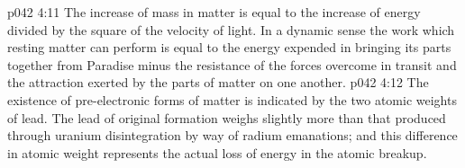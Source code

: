 \vs p042 4:11 The increase of mass in matter is equal to the increase of energy divided by the square of the velocity of light. In a dynamic sense the work which resting matter can perform is equal to the energy expended in bringing its parts together from Paradise minus the resistance of the forces overcome in transit and the attraction exerted by the parts of matter on one another.
\vs p042 4:12 \pc The existence of pre\hyp{}electronic forms of matter is indicated by the two atomic weights of lead. The lead of original formation weighs slightly more than that produced through uranium disintegration by way of radium emanations; and this difference in atomic weight represents the actual loss of energy in the atomic breakup.
